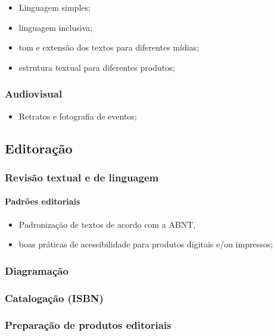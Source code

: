 \begin{itemize}
	\item
	Linguagem simples;
	\item
	linguagem inclusiva;
	\item
	tom e extensão dos textos para diferentes mídias;
	\item
	estrutura textual para diferentes produtos;
\end{itemize}

\subsubsection{Audiovisual}

\begin{itemize}
	\item
	Retratos e fotografia de eventos;
\end{itemize}

\subsection{Editoração}

\subsubsection{Revisão textual e de linguagem}

\paragraph{Padrões editoriais}

\begin{itemize}

	\item
	Padronização de textos de acordo com a ABNT,
	\item
	boas práticas de acessibilidade para produtos digitais e/ou impressos;
\end{itemize}

\subsubsection{Diagramação}

\subsubsection{Catalogação (ISBN)}

\subsubsection{Preparação de produtos editoriais}

